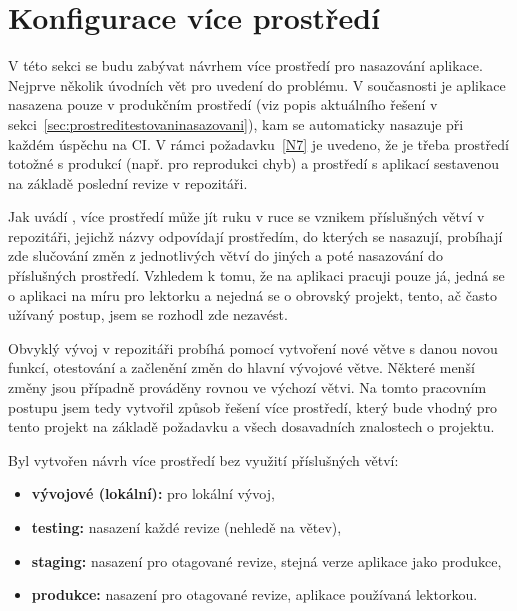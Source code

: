 \section{Konfigurace více prostředí}\label{sec:konfiguraceviceprostredi}

V této sekci se budu zabývat návrhem více prostředí pro nasazování aplikace. Nejprve několik úvodních vět pro uvedení do problému. V současnosti je aplikace nasazena pouze v produkčním prostředí (viz popis aktuálního řešení v sekci~\ref{sec:prostreditestovaninasazovani}), kam se automaticky nasazuje při každém úspěchu na CI. V rámci požadavku~\ref{N7} je uvedeno, že je třeba prostředí totožné s produkcí (např. pro reprodukci chyb) a prostředí s aplikací sestavenou na základě poslední revize v repozitáři.

Jak uvádí \cite{deployment-beanstalk}, více prostředí může jít ruku v ruce se vznikem příslušných větví v repozitáři, jejichž názvy odpovídají prostředím, do kterých se nasazují, probíhají zde slučování změn z jednotlivých větví do jiných a poté nasazování do příslušných prostředí. Vzhledem k tomu, že na aplikaci pracuji pouze já, jedná se o aplikaci na míru pro lektorku a nejedná se o obrovský projekt, tento, ač často užívaný postup, jsem se rozhodl zde nezavést. 

Obvyklý vývoj v repozitáři probíhá pomocí vytvoření nové větve s danou novou funkcí, otestování a začlenění změn do hlavní vývojové větve. Některé menší změny jsou případně prováděny rovnou ve výchozí větvi. Na tomto pracovním postupu jsem tedy vytvořil způsob řešení více prostředí, který bude vhodný pro tento projekt na základě požadavku a všech dosavadních znalostech o projektu.

Byl vytvořen návrh více prostředí bez využití příslušných větví:
\begin{itemize}
    \item \textbf{vývojové (lokální):} pro lokální vývoj,
    \item \textbf{testing:} nasazení každé revize (nehledě na větev),
    \item \textbf{staging:} nasazení pro otagované revize, stejná verze aplikace jako produkce,
    \item \textbf{produkce:} nasazení pro otagované revize, aplikace používaná lektorkou.
\end{itemize}

